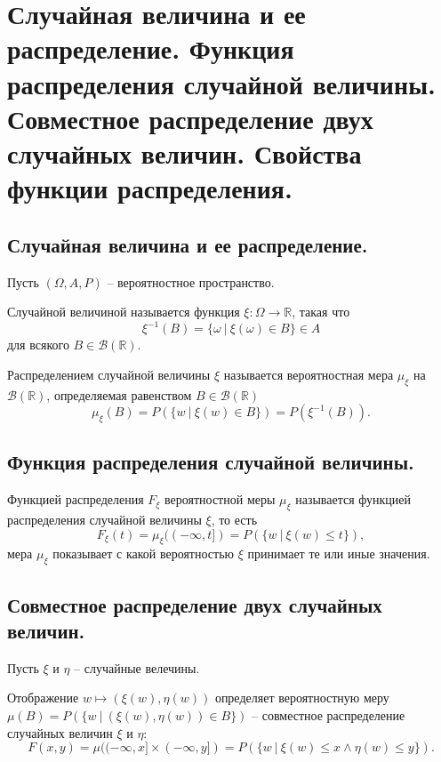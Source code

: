 \section{Случайная величина и ее распределение. Функция распределения случайной величины. Совместное распределение двух случайных величин. Свойства функции распределения.}

\subsection{Случайная величина и ее распределение.}
Пусть $(\Omega, A, P)$ -- вероятностное пространство.
\begin{definition}
    Случайной величиной называется функция $\xi : \Omega \to \mathbb{R}$, такая что
    \[
        \xi^{-1}(B) = \{\omega \> | \> \xi(\omega) \in B\} \in A
    \]
    для всякого $B \in \mathcal{B}(\mathbb{R})$.
\end{definition}
\begin{definition}
    Распределением случайной величины $\xi$ называется вероятностная мера $\mu_{\xi}$ на $\mathcal{B}(\mathbb{R})$, определяемая равенством $B \in \mathcal{B}(\mathbb{R})$
    \[
        \mu_{\xi} (B) = P(\{ w \> | \> \xi(w) \in B \}) = P(\xi^{-1}(B)).
    \]
\end{definition}

\subsection{Функция распределения случайной величины.}
\begin{definition}
    Функцией распределения $F_\xi$ вероятностной меры $\mu_\xi$ называется функцией распределения случайной величины $\xi$, то есть
    \[
        F_\xi(t) = \mu_\xi((-\infty, t]) = P(\{ w \> | \> \xi(w) \leqslant t \}),
    \]
    мера $\mu_\xi$ показывает с какой вероятностью $\xi$ принимает те или иные значения.
\end{definition}

\subsection{Совместное распределение двух случайных величин.}
Пусть $\xi$ и $\eta$ -- случайные велечины.
\begin{definition}
    Отображение  $w \mapsto (\xi(w), \eta(w))$ определяет вероятностную меру $\mu(B) = P(\{ w \> | \> (\xi(w), \eta(w)) \in B\})$ -- совместное распределение случайных величин $\xi$ и $\eta$:
    \[
        F(x,y) = \mu((-\infty, x] \times (-\infty, y]) = P(\{ w \> | \> \xi(w) \leqslant x \wedge \eta(w) \leqslant y \}).
    \]
\end{definition}

